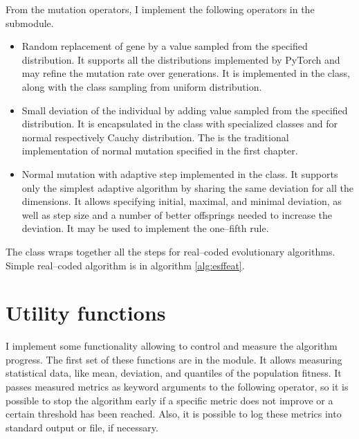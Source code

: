 From the mutation operators, I implement the following operators in the  submodule.
\begin{itemize}
    \item Random replacement of gene by a value sampled from the specified distribution. It supports all the distributions implemented by PyTorch \citep{PyTorchDoc} and may refine the mutation rate over generations. It is implemented in the  class, along with the  class sampling from uniform distribution.
    \item Small deviation of the individual by adding value sampled from the specified distribution. It is encapsulated in the  class with specialized classes  and  for normal respectively Cauchy distribution. The  is the traditional implementation of normal mutation specified in the first chapter.
    \item Normal mutation with adaptive step implemented in the  class. It supports only the simplest adaptive algorithm by sharing the same deviation for all the dimensions. It allows specifying initial, maximal, and minimal deviation, as well as step size and a number of better offsprings needed to increase the deviation. It may be used to implement the one--fifth rule.
\end{itemize}

The  class wraps together all the steps for real--coded evolutionary algorithms. Simple real--coded algorithm is in algorithm \ref{alg:esffeat}.
    



\section{Utility functions}

I implement some functionality allowing to control and measure the algorithm progress. The first set of these functions are in the  module. It allows measuring statistical data, like mean, deviation, and quantiles of the population fitness. It passes measured metrics as keyword arguments to the following operator, so it is possible to stop the algorithm early if a specific metric does not improve or a certain threshold has been reached. Also, it is possible to log these metrics into standard output or file, if necessary.


